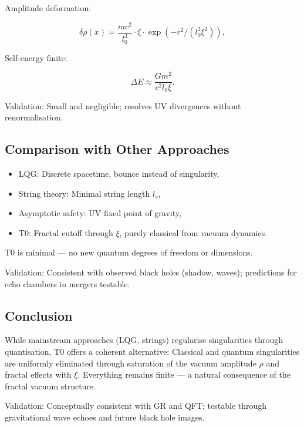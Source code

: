 	Amplitude deformation:
	
	\begin{equation}
		\delta \rho(x) = \frac{m c^2}{l_0^3} \cdot \xi \cdot \exp\left(-r^2 / (l_0^2 \xi^2)\right),
	\end{equation}
	
	Self-energy finite:
	
	\begin{equation}
		\Delta E \approx \frac{G m^2}{c^2 l_0 \xi}.
	\end{equation}
	
	Validation: Small and negligible; resolves UV divergences without renormalisation.
	
	\subsection*{Comparison with Other Approaches}
	
	\begin{itemize}
		\item LQG: Discrete spacetime, bounce instead of singularity,
		\item String theory: Minimal string length \(l_s\),
		\item Asymptotic safety: UV fixed point of gravity,
		\item T0: Fractal cutoff through \(\xi\), purely classical from vacuum dynamics.
	\end{itemize}
	
	T0 is minimal — no new quantum degrees of freedom or dimensions.
	
	Validation: Consistent with observed black holes (shadow, waves); predictions for echo chambers in mergers testable.
	
	\subsection*{Conclusion}
	
	While mainstream approaches (LQG, strings) regularise singularities through quantisation, T0 offers a coherent alternative: Classical and quantum singularities are uniformly eliminated through saturation of the vacuum amplitude \(\rho\) and fractal effects with \(\xi\). Everything remains finite — a natural consequence of the fractal vacuum structure.
	
	Validation: Conceptually consistent with GR and QFT; testable through gravitational wave echoes and future black hole images.



